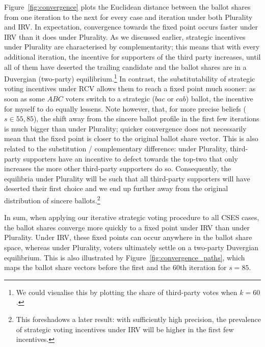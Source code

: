 \documentclass[12pt, letter]{article}
\begin{document}
Figure~\ref{fig:convergence} plots the Euclidean distance between the ballot shares from one iteration to the next for every case and iteration under both Plurality and IRV. In expectation, convergence towards the fixed point occurs faster under IRV than it does under Plurality. As we discussed earlier, strategic incentives under Plurality are characterised by complementarity; this means that with every additional iteration, the incentive for supporters of the third party increases, until all of them have deserted the trailing candidate and the ballot shares are in a Duvergian (two-party) equilibrium.\footnote{We could visualise this by plotting the share of third-party votes when $k = 60$.} In contrast, the substitutability of strategic voting incentives under RCV allows them to reach a fixed point much sooner: as soon as some $ABC$ voters switch to a strategic ($bac$ or $cab$) ballot, the incentive for myself to do equally lessens. Note however, that, for more precise beliefs ($s \in {55, 85}$), the shift away from the sincere ballot profile in the first few iterations is much bigger than under Plurality; quicker convergence does not necessarily mean that the fixed point is closer to the original ballot share vector. This is also related to the substitution / complementary difference: under Plurality, third-party supporters have an incentive to defect towards the top-two that only increases the more other third-party supporters do so. Consequently, the equilibria under Plurality will be such that all third-party supporters will have deserted their first choice and we end up further away from the original distribution of sincere ballots.\footnote{This foreshadows a later result: with sufficiently high precision, the prevalence of strategic voting incentives under IRV will be higher in the first few incentives.}

In sum, when applying our iterative strategic voting procedure to all CSES cases, the ballot shares converge more quickly to a fixed point under IRV than under Plurality. Under IRV, these fixed points can occur anywhere in the ballot share space, whereas under Plurality, voters ultimately settle on a two-party Duvergian equilibrium. This is also illustrated by Figure~\ref{fig:convergence_paths}, which maps the ballot share vectors before the first and the 60th iteration for $s = 85$.
\end{document}
